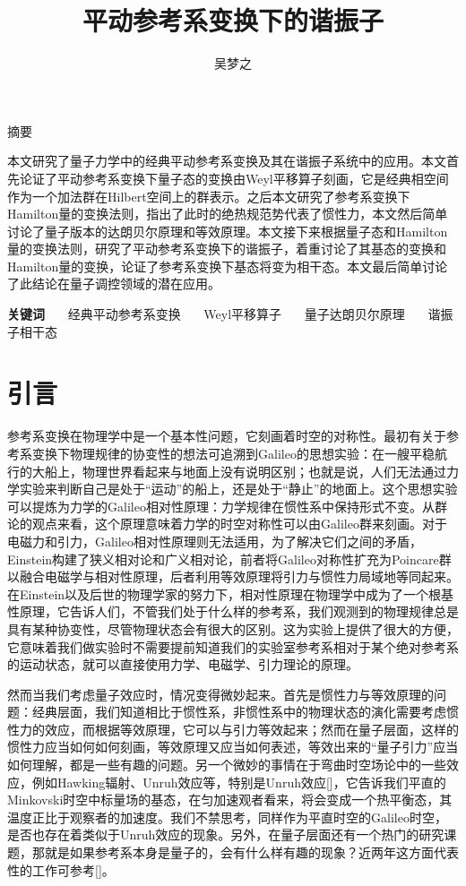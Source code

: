 \documentclass[a4paper]{article}
\title{平动参考系变换下的谐振子}
\author{吴梦之}
\begin{document}
    \maketitle

    \begin{center}
        \fontsize{18pt}{0}摘\quad\quad 要
    \end{center}

        本文研究了量子力学中的经典平动参考系变换及其在谐振子系统中的应用。本文首先论证了平动参考系变换下量子态的变换由Weyl平移算子刻画，它是经典相空间作为一个加法群在Hilbert空间上的群表示。之后本文研究了参考系变换下Hamilton量的变换法则，指出了此时的绝热规范势代表了惯性力，本文然后简单讨论了量子版本的达朗贝尔原理和等效原理。本文接下来根据量子态和Hamilton量的变换法则，研究了平动参考系变换下的谐振子，着重讨论了其基态的变换和Hamilton量的变换，论证了参考系变换下基态将变为相干态。本文最后简单讨论了此结论在量子调控领域的潜在应用。

    \textbf{关键词} \ \ \ 经典平动参考系变换 \ \ \ Weyl平移算子 \ \ \ 量子达朗贝尔原理 \ \ \ 谐振子相干态


    \section{引言}

        参考系变换在物理学中是一个基本性问题，它刻画着时空的对称性。最初有关于参考系变换下物理规律的协变性的想法可追溯到Galileo的思想实验：在一艘平稳航行的大船上，物理世界看起来与地面上没有说明区别；也就是说，人们无法通过力学实验来判断自己是处于“运动”的船上，还是处于“静止”的地面上。这个思想实验可以提炼为力学的Galileo相对性原理：力学规律在惯性系中保持形式不变。从群论的观点来看，这个原理意味着力学的时空对称性可以由Galileo群来刻画。对于电磁力和引力，Galileo相对性原理则无法适用，为了解决它们之间的矛盾，Einstein构建了狭义相对论和广义相对论，前者将Galileo对称性扩充为Poincare群以融合电磁学与相对性原理，后者利用等效原理将引力与惯性力局域地等同起来。在Einstein以及后世的物理学家的努力下，相对性原理在物理学中成为了一个根基性原理，它告诉人们，不管我们处于什么样的参考系，我们观测到的物理规律总是具有某种协变性，尽管物理状态会有很大的区别。这为实验上提供了很大的方便，它意味着我们做实验时不需要提前知道我们的实验室参考系相对于某个绝对参考系的运动状态，就可以直接使用力学、电磁学、引力理论的原理。

        然而当我们考虑量子效应时，情况变得微妙起来。首先是惯性力与等效原理的问题：经典层面，我们知道相比于惯性系，非惯性系中的物理状态的演化需要考虑惯性力的效应，而根据等效原理，它可以与引力等效起来；然而在量子层面，这样的惯性力应当如何如何刻画，等效原理又应当如何表述，等效出来的“量子引力”应当如何理解，都是一些有趣的问题。另一个微妙的事情在于弯曲时空场论中的一些效应，例如Hawking辐射、Unruh效应等，特别是Unruh效应[]，它告诉我们平直的Minkovski时空中标量场的基态，在匀加速观者看来，将会变成一个热平衡态，其温度正比于观察者的加速度。我们不禁思考，同样作为平直时空的Galileo时空，是否也存在着类似于Unruh效应的现象。另外，在量子层面还有一个热门的研究课题，那就是如果参考系本身是量子的，会有什么样有趣的现象？近两年这方面代表性的工作可参考[]。
\end{document}
